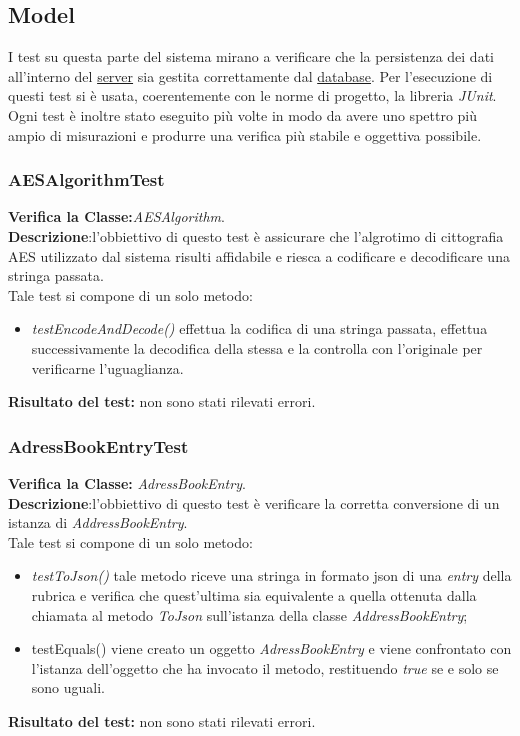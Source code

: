 \subsection{Model}
I test su questa parte del sistema mirano a verificare che la persistenza dei dati all'interno del \underline{server} sia gestita correttamente dal \underline{database}.
Per l'esecuzione di questi test si è usata, coerentemente con le norme di progetto, la libreria \textit{JUnit}.
Ogni test è inoltre stato eseguito più volte in modo da avere uno spettro più ampio di misurazioni e produrre una verifica più stabile e oggettiva possibile.

\subsubsection{AESAlgorithmTest}
\textbf{Verifica la Classe:}\textit{AESAlgorithm}.\\
\textbf{Descrizione}:l'obbiettivo di questo test è assicurare che l'algrotimo di cittografia AES utilizzato dal sistema \caName risulti affidabile e riesca a codificare e decodificare una stringa passata.\\
Tale test si compone di un solo metodo:
\begin{itemize}
\item \textit{testEncodeAndDecode() } effettua la codifica di una stringa passata, effettua successivamente la decodifica della stessa e la controlla con l'originale per verificarne l'uguaglianza.
\end{itemize}
\textbf{Risultato del test:} non sono stati rilevati errori.

\begin{table}
\end{table}

\subsubsection{AdressBookEntryTest}
\textbf{Verifica la Classe:} \textit{AdressBookEntry}.\\
\textbf{Descrizione}:l'obbiettivo di questo test è verificare la corretta conversione di un istanza di \textit{AddressBookEntry}.\\
Tale test si compone di un solo metodo:
\begin{itemize}
\item \textit{testToJson() } tale metodo riceve una stringa in formato json di una 	\textit{entry} della rubrica e verifica che quest'ultima sia equivalente a quella ottenuta dalla chiamata al metodo \textit{ToJson} sull'istanza della classe \textit{AddressBookEntry};
\item{testEquals()} viene creato un oggetto \textit{AdressBookEntry} e viene confrontato con l'istanza dell'oggetto che ha invocato il metodo, restituendo \textit{true} se e solo se sono uguali.
\end{itemize}
\textbf{Risultato del test:} non sono stati rilevati errori.

